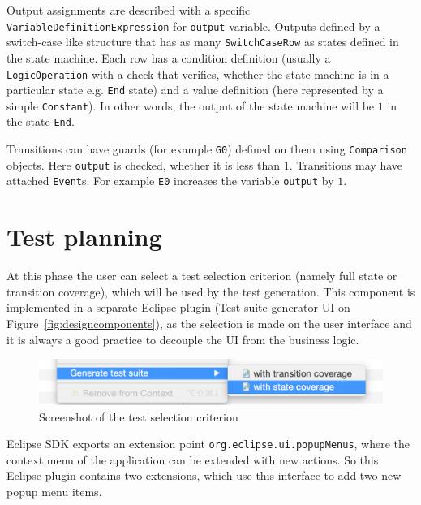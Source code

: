 Output assignments are described with a specific \texttt{VariableDefinitionExpression} for \texttt{output} variable. Outputs defined by a switch-case like structure that has as many \texttt{SwitchCaseRow} as states defined in the state machine. Each row has a condition definition (usually a \texttt{LogicOperation} with a check that verifies, whether the state machine is in a particular state e.g. \texttt{End} state) and a value definition (here represented by a simple \texttt{Constant}). In other words, the output of the state machine will be $1$ in the state \texttt{End}.

Transitions can have guards (for example \texttt{G0}) defined on them using \texttt{Comparison} objects. Here \texttt{output} is checked, whether it is less than $1$. Transitions may have attached \texttt{Event}s. For example \texttt{E0} increases the variable \texttt{output} by $1$.


\section{Test planning}
\label{sec:testplanningimplementation}

At this phase the user can select a test selection criterion (namely full state or transition coverage), which will be used by the test generation. This component is implemented in a separate Eclipse plugin (Test suite generator UI on Figure~\ref{fig:designcomponents}), as the selection is made on the user interface and it is always a good practice to decouple the UI from the business logic.
	
\begin{figure}[htp]
\centering
\includegraphics[scale=0.4]{figures/implementation_screenshot}
\caption{Screenshot of the test selection criterion}
\label{fig:implementation_screenshot}
\end{figure}
	
Eclipse SDK exports an extension point \texttt{org.eclipse.ui.popupMenus}, where the context menu of the application can be extended with new actions. So this Eclipse plugin contains two extensions, which use this interface to add two new popup menu items.
	
	
